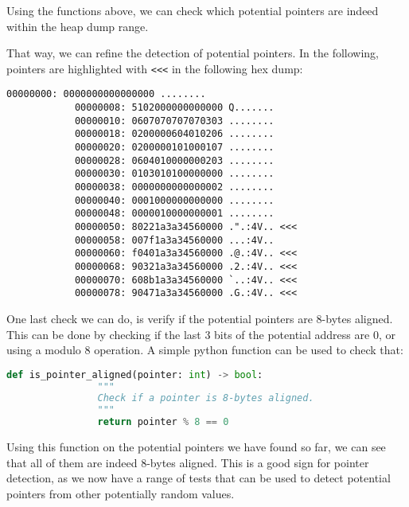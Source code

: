     Using the functions above, we can check which potential pointers are indeed within the heap dump range.

    \begin{minipage}{\dimexpr\linewidth-20pt}
        That way, we can refine the detection of potential pointers. In the following, pointers are highlighted with \lstinline[style=hexdump]!<<<! in the following hex dump:

        \begin{lstlisting}[style=hexdump, caption={8 bytes per line visualization of a Hex Dump from \textit{Training/basic/V\_7\_8\_P1/16/5070-1643978841-heap.raw}}]
            00000000: 0000000000000000 ........
            00000008: 5102000000000000 Q.......
            00000010: 0607070707070303 ........
            00000018: 0200000604010206 ........
            00000020: 0200000101000107 ........
            00000028: 0604010000000203 ........
            00000030: 0103010100000000 ........
            00000038: 0000000000000002 ........
            00000040: 0001000000000000 ........
            00000048: 0000010000000001 ........
            00000050: 80221a3a34560000 .".:4V.. <<<
            00000058: 007f1a3a34560000 ...:4V.. 
            00000060: f0401a3a34560000 .@.:4V.. <<<
            00000068: 90321a3a34560000 .2.:4V.. <<<
            00000070: 608b1a3a34560000 `..:4V.. <<<
            00000078: 90471a3a34560000 .G.:4V.. <<<
        \end{lstlisting}
    \end{minipage}

    \begin{minipage}{\dimexpr\linewidth-20pt}
        One last check we can do, is verify if the potential pointers are  8-bytes aligned. This can be done by checking if the last 3 bits of the potential address are 0, or using a modulo 8 operation. A simple python function can be used to check that:

        \begin{lstlisting}[language=python, caption={Python function to check if a potential pointer is 8-bytes aligned}]
            def is_pointer_aligned(pointer: int) -> bool:
                """
                Check if a pointer is 8-bytes aligned.
                """
                return pointer % 8 == 0
        \end{lstlisting}
    \end{minipage}

    Using this function on the potential pointers we have found so far, we can see that all of them are indeed 8-bytes aligned. This is a good sign for pointer detection, as we now have a range of tests that can be used to detect potential pointers from other potentially random values.

